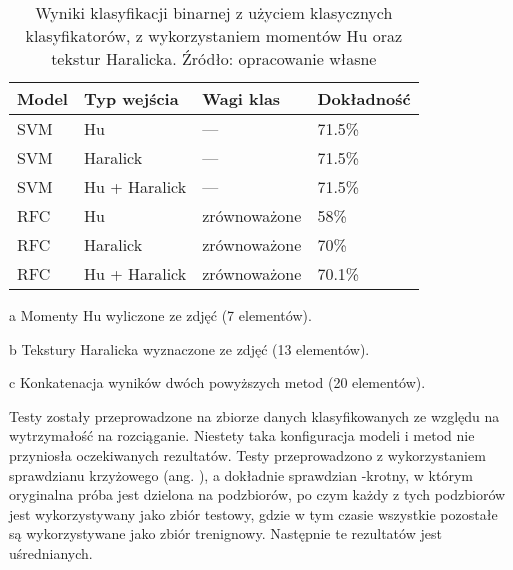 \begin{table}[h]
	\centering
	\begin{threeparttable}
		\caption{Wyniki klasyfikacji binarnej z użyciem klasycznych klasyfikatorów, z wykorzystaniem momentów Hu oraz tekstur Haralicka. Źródło: opracowanie własne}
		\label{hu_haralick_table}
		\begin{tabularx}{1\textwidth}{ |X|X|X|X| }
		  \hline
		  \textbf{Model} & \textbf{Typ wejścia} & \textbf{Wagi klas} & \textbf{Dokładność}\\

		  \hline
		  SVM & Hu\tnote{a} & — & 71.5\%\\

		  \hline
		  SVM & Haralick\tnote{b} & — & 71.5\%\\

		  \hline
		  SVM & Hu + Haralick\tnote{c} & — & 71.5\%\\

		  \hline
		  RFC & Hu & zrównoważone & 58\%\\

		  \hline
  		  RFC & Haralick & zrównoważone & 70\%\\
  		  
		  \hline
  		  RFC & Hu + Haralick & zrównoważone & 70.1\%\\
  		  
		  \hline
		\end{tabularx}
		\begin{tablenotes}
			\footnotesize
			\item[a] Momenty Hu wyliczone ze zdjęć (7 elementów).
			\item[b] Tekstury Haralicka wyznaczone ze zdjęć (13 elementów).
			\item[c] Konkatenacja wyników dwóch powyższych metod (20 elementów).
		\end{tablenotes}
	\end{threeparttable}
\end{table}
Testy zostały przeprowadzone na zbiorze danych klasyfikowanych ze względu na wytrzymałość na rozciąganie. Niestety taka konfiguracja modeli i metod nie przyniosła oczekiwanych rezultatów. Testy przeprowadzono z wykorzystaniem sprawdzianu krzyżowego (ang. ), a dokładnie sprawdzian -krotny, w którym oryginalna próba jest dzielona na  podzbiorów, po czym każdy z tych podzbiorów jest wykorzystywany jako zbiór testowy, gdzie w tym czasie wszystkie pozostałe są wykorzystywane jako zbiór trenignowy. Następnie te  rezultatów jest uśrednianych. 
